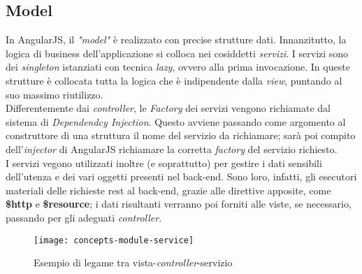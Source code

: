 \subsection{Model}
In AngularJS, il \emph{"model"} è realizzato con precise strutture dati. Innanzitutto, la logica di business dell'applicazione si colloca nei cosiddetti \emph{servizi}. I servizi sono dei \emph{singleton} istanziati con tecnica \emph{lazy}, ovvero alla prima invocazione. In queste strutture è collocata tutta la logica che è indipendente dalla \emph{view}, puntando al suo massimo riutilizzo.\\
Differentemente dai \emph{controller}, le \emph{Factory} dei servizi vengono richiamate dal sistema di \emph{Dependendcy Injection}. Questo avviene passando come argomento al construttore di una struttura il nome del servizio da richiamare; sarà poi compito dell'\emph{injector} di AngularJS richiamare la corretta \emph{factory} del servizio richiesto.\\
I servizi vegono utilizzati inoltre (e soprattutto) per gestire i dati sensibili dell'utenza e dei vari oggetti presenti nel \gls{back-end}. Sono loro, infatti, gli esecutori materiali delle richieste \gls{rest} al \gls{back-end}, grazie alle direttive apposite, come \textbf{\$http} e \textbf{\$resource}; i dati risultanti verranno poi forniti alle viste, se necessario, passando per gli adeguati \emph{controller}.

\begin{figure}[!h] 
    \centering 
    \texttt{[image: concepts-module-service]} 
    \caption{Esempio di legame tra vista-\emph{controller}-servizio}
\end{figure}

